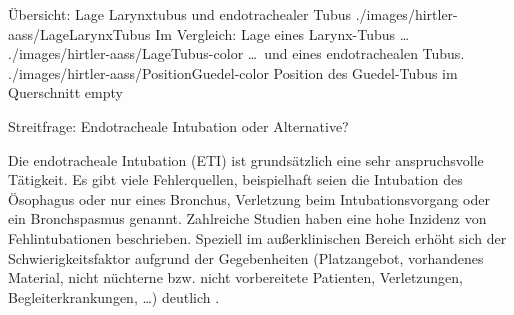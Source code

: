 \begin{PictureSeries}{}{Übersicht: Lage Larynxtubus und endotrachealer Tubus
}
{./images/hirtler-aass/LageLarynxTubus}
{Im Vergleich: Lage eines Larynx-Tubus \ldots} 
{./images/hirtler-aass/LageTubus-color}
{\ldots\ und eines endotrachealen Tubus.}
{./images/hirtler-aass/PositionGuedel-color}
{Position des Guedel-Tubus im Querschnitt}
{empty}
{}
\end{PictureSeries}


\Text
{Streitfrage: Endotracheale Intubation oder Alternative?}
{%
Die endotracheale Intubation (ETI) ist grundsätzlich eine
sehr anspruchsvolle Tätigkeit.  Es gibt viele
Fehlerquellen, beispielhaft seien die Intubation des
Ösophagus oder nur eines Bronchus, Verletzung
beim Intubationsvorgang oder ein Bronchspasmus genannt.
Zahlreiche Studien haben eine hohe Inzidenz von
Fehlintubationen beschrieben.
Speziell im 
außerklinischen Bereich erhöht sich der
Schwierigkeitsfaktor aufgrund der Gegebenheiten
(Platzangebot, vorhandenes Material, nicht nüchterne bzw.
nicht vorbereitete Patienten, Verletzungen,
Begleiterkrankungen, \ldots) deutlich
\cite{Timmermann2006,Thierbach2004}.

}
